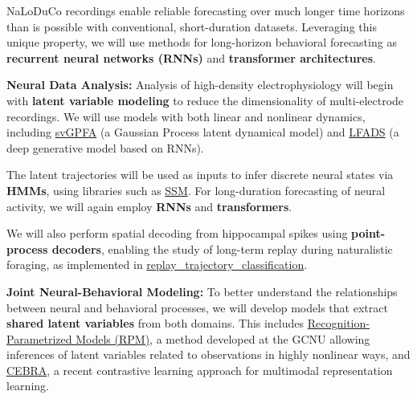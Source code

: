 NaLoDuCo recordings enable reliable forecasting over much longer time horizons
than is possible with conventional, short-duration datasets.
%
Leveraging this unique property, we will use methods for long-horizon
behavioral forecasting as \textbf{recurrent neural networks (RNNs)} and
\textbf{transformer architectures}.

\vspace{1em}
\noindent\textbf{Neural Data Analysis:}
Analysis of high-density electrophysiology will begin with \textbf{latent
variable modeling} to reduce the dimensionality of multi-electrode recordings.
We will use models with both linear and nonlinear dynamics, including
\href{https://github.com/joacorapela/svGPFA}{svGPFA} (a Gaussian Process latent
dynamical model) and \href{https://snel.ai/resources/lfads/}{LFADS} (a deep
generative model based on RNNs).

The latent trajectories will be used as inputs to infer discrete neural states
via \textbf{HMMs}, using libraries such as
\href{https://github.com/lindermanlab/ssm}{SSM}. For long-duration forecasting
of neural activity, we will again employ \textbf{RNNs} and
\textbf{transformers}.

We will also perform spatial decoding from hippocampal spikes using
\textbf{point-process decoders}, enabling the study of long-term replay during
naturalistic foraging, as implemented in
\href{https://github.com/Eden-Kramer-Lab/replay_trajectory_classification}{replay\_trajectory\_classification}.

\vspace{1em}
\noindent\textbf{Joint Neural-Behavioral Modeling:}
To better understand the relationships between neural and behavioral processes,
we will develop models that extract \textbf{shared latent variables} from both
domains. This includes
\href{https://github.com/gatsby-sahani/rpm-aistats-2023}{Recognition-Parametrized
Models (RPM)}, a method developed at the GCNU allowing inferences of latent
variables related to observations in highly nonlinear ways,
and \href{https://cebra.ai/}{CEBRA}, a recent contrastive learning
approach for multimodal representation learning.

